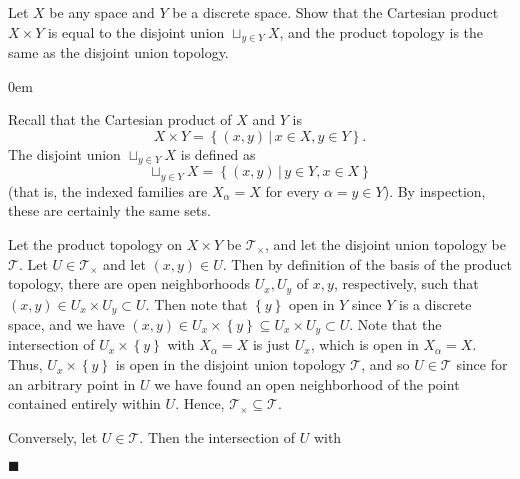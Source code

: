 \documentclass[12pt]{article}
\renewcommand{\qed}{\hfill$\blacksquare$}
\renewenvironment{proof}{\begin{addmargin}[1em]{0em}\begin{newproof}}{\end{newproof}\end{addmargin}\qed}
\newenvironment{exercise}[2][Exercise]{\begin{trivlist}
\item[\hskip \labelsep {\bfseries #1}\hskip \labelsep {\bfseries #2.}]}{\end{trivlist}}
\begin{document}
\begin{exercise}{3.45}
Let $X$ be any space and $Y$ be a discrete space. Show that the Cartesian product $X\times Y$ is equal to the disjoint union $\sqcup_{y\in Y} X$, and the product topology is the same as the disjoint union topology.
\end{exercise}
\begin{proof}
Recall that the Cartesian product of $X$ and $Y$ is $$X\times Y = \left\{ \left(x,y\right) \, | \, x\in X, y\in Y\right\}.$$ The disjoint union $\sqcup_{y\in Y} X$ is defined as $$ \sqcup_{y\in Y} X  = \left\{ \left(x,y\right) \, | \, y\in Y, x\in X\right\} $$ (that is, the indexed families are $X_{\alpha} = X$ for every $\alpha = y \in Y$). By inspection, these are certainly the same sets. 

Let the product topology on $X\times Y$ be $\mathcal{T}_{\times}$, and let the disjoint union topology be $\mathcal{T}$. Let $U \in \mathcal{T}_{\times}$ and let $\left(x,y\right) \in U$. Then by definition of the basis of the product topology, there are open neighborhoods $U_x, U_y$ of $x,y$, respectively, such that $\left(x,y\right) \in U_x \times U_y \subset U$. Then note that $\left\{y\right\}$ open in $Y$ since $Y$ is a discrete space, and we have $
\left(x,y\right) \in U_x \times \left\{y\right\} \subseteq U_x \times U_y \subset U$. Note that the intersection of $U_x \times \left\{y\right\}$ with $X_{\alpha}=X$ is just $U_x$, which is open in $X_{\alpha}=X$. Thus, $U_x \times \left\{y\right\}$ is open in the disjoint union topology $\mathcal{T}$, and so $U \in \mathcal{T}$ since for an arbitrary point in $U$ we have found an open neighborhood of the point contained entirely within $U$. Hence, $\mathcal{T}_{\times} \subseteq \mathcal{T}$.

Conversely, let $U \in \mathcal{T}$. Then the intersection of $U$ with 
\end{proof}
\end{document}
